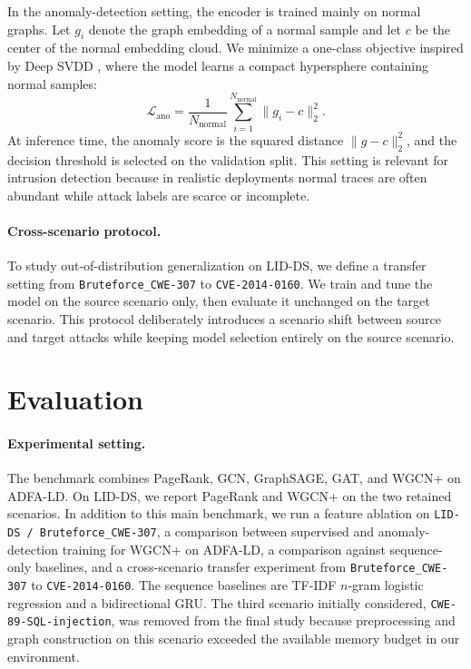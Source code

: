 \documentclass{article}
\begin{document}
In the anomaly-detection setting, the encoder is trained mainly on normal graphs. Let $g_i$ denote the graph embedding of a normal sample and let $c$ be the center of the normal embedding cloud. We minimize a one-class objective inspired by Deep SVDD \cite{deep_svdd}, where the model learns a compact hypersphere containing normal samples:
\[
\mathcal{L}_{\mathrm{ano}} = \frac{1}{N_{\mathrm{normal}}} \sum_{i=1}^{N_{\mathrm{normal}}} \|g_i - c\|_2^2.
\]
At inference time, the anomaly score is the squared distance $\|g-c\|_2^2$, and the decision threshold is selected on the validation split. This setting is relevant for intrusion detection because in realistic deployments normal traces are often abundant while attack labels are scarce or incomplete.

\paragraph{Cross-scenario protocol.}
To study out-of-distribution generalization on LID-DS, we define a transfer setting from \texttt{Bruteforce\_CWE-307} to \texttt{CVE-2014-0160}. We train and tune the model on the source scenario only, then evaluate it unchanged on the target scenario. This protocol deliberately introduces a scenario shift between source and target attacks while keeping model selection entirely on the source scenario.


\section{Evaluation}

\paragraph{Experimental setting.}
The benchmark combines PageRank, GCN, GraphSAGE, GAT, and WGCN+ on ADFA-LD. On LID-DS, we report PageRank and WGCN+ on the two retained scenarios. In addition to this main benchmark, we run a feature ablation on \texttt{LID-DS / Bruteforce\_CWE-307}, a comparison between supervised and anomaly-detection training for WGCN+ on ADFA-LD, a comparison against sequence-only baselines, and a cross-scenario transfer experiment from \texttt{Bruteforce\_CWE-307} to \texttt{CVE-2014-0160}. The sequence baselines are TF-IDF $n$-gram logistic regression and a bidirectional GRU. The third scenario initially considered, \texttt{CWE-89-SQL-injection}, was removed from the final study because preprocessing and graph construction on this scenario exceeded the available memory budget in our environment.
\end{document}
